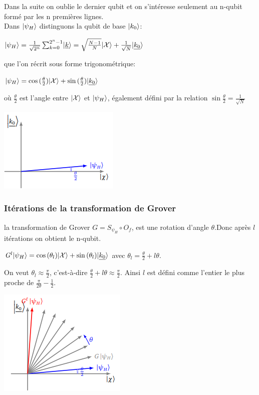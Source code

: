 \documentclass[12pt,openany]{report}
\DeclarePairedDelimiter\ket{\lvert}{\rangle}
\begin{document}
Dans la suite on oublie le dernier qubit et on s'intéresse seulement au n-qubit formé par les n premières lignes.\\
Dans $\ket{\psi_H}$ distinguons la qubit de base $\ket{k_0} $:

\begin{center}
$\ket{\psi_H}=\frac{1}{\sqrt{2^n}}\sum_{k=0}^{2^n-1}\ket{\underline{k}}=\sqrt{\frac{N-1}{N}}  \ket{\mathcal{X}} +\frac{1}{\sqrt{N}}\ket{\underline{k_0}}  $

\end{center}

que l'on récrit sous forme trigonométrique:
\begin{center}
$\ket{\psi_H}=\cos{(\frac{\theta}{2})}\ket{\mathcal{X}} + \sin{(\frac{\theta}{2})}\ket{\underline{k_0}} $
\end{center}

où $\frac{\theta}{2} $ est l'angle entre
$\ket{\mathcal{X}} $ et $\ket{\psi_H} $, également défini par la relation $\sin{\frac{\theta}{2}}=\frac{1}{\sqrt{N}} $


\begin{center}
\includegraphics[scale=1.2]{./etape}
\end{center}

\subsubsection{Itérations de la transformation de Grover}
la transformation de Grover $\mathit{G}=\mathit{S}_{\psi_H}\circ \mathit{O}_f   $, est une rotation d'angle $\theta $.Donc après $l$ itérations on obtient le n-qubit.
\begin{center}
$ \mathit{G}^{l}\ket{\psi_H}= \cos{(\theta_l)}\ket{\mathcal{X}}+ \sin{(\theta_l)}\ket{\underline{k_0}} $ avec $ \theta_l=\frac{\theta}{2}+ l \theta $.
\end{center}
On veut $ \theta_l \approx \frac{\pi}{2} $, c'est-à-dire $\frac{\theta}{2}+ l \theta \approx \frac{\pi}{2}  $. Ainsi $l$ est défini comme l'entier le plus proche de $\frac{\pi}{2 \theta}-\frac{1}{2} $.
\begin{center}
\includegraphics[scale=1.2]{./iteration}
\end{center}
\end{document}
